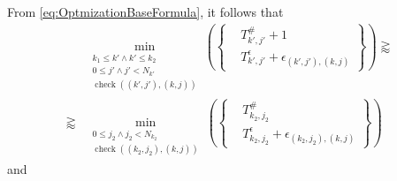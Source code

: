 \documentclass[conference]{IEEEtran}
\DeclareMathOperator{\functioncheck}{check}
\begin{document}
From \eqref{eq:OptmizationBaseFormula}, it follows that
\begin{equation}
  \begin{aligned}
    &
    \min
    _
    {
      \begin{aligned}
        k_1 \leq k' \wedge k' \leq k_2\\
        0 \leq j' \wedge j' < N_{k'}\\
        \functioncheck
        {
          \left(
            \left( k', j' \right),
            \left( k, j \right)
          \right)
        }
      \end{aligned}
    }
    {
      \left(
        \left\{
          \begin{aligned}
            & T_{k', j'}^{\#} + 1\\
            & T_{k', j'}^{\epsilon}
            +
            \epsilon
            _
            {
              \left( k', j' \right),
              \left( k, j \right)
            }
          \end{aligned}
        \right\}
      \right)
    }
    \gtrapprox
    \\
    \gtrapprox
    &
    \min
    _
    {
      \begin{aligned}
        0 \leq j_2 \wedge j_2 < N_{k_2}\\
        \functioncheck
        {
          \left(
            \left( k_2, j_2 \right),
            \left( k, j \right)
          \right)
        }
      \end{aligned}
    }
    {
      \left(
        \left\{
          \begin{aligned}
            & T_{k_2, j_2}^{\#}\\
            & T_{k_2, j_2}^{\epsilon}
            +
            \epsilon
            _
            {
              \left( k_2, j_2 \right),
              \left( k, j \right)
            }
          \end{aligned}
        \right\}
      \right)
    }
  \end{aligned}
  \label{eq:OptimizationFormula1}
\end{equation}
and
\end{document}
